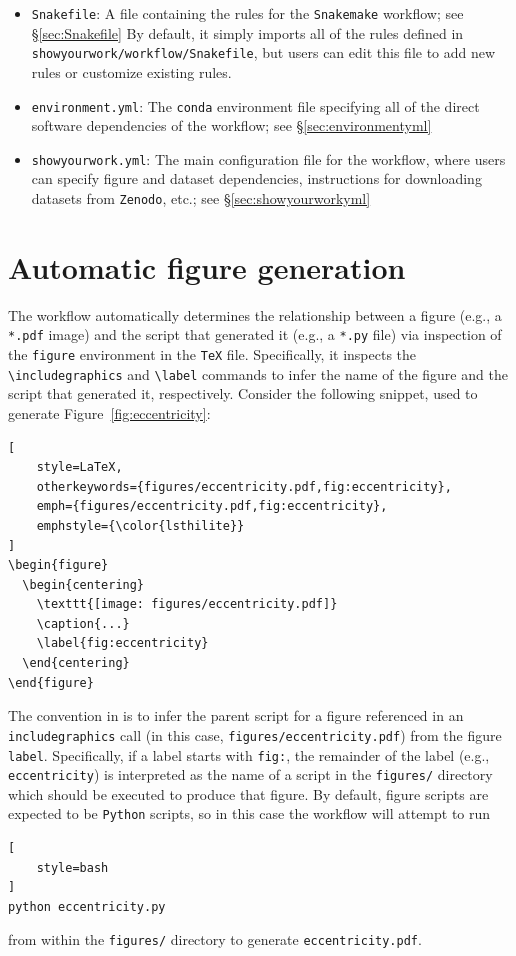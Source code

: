\documentclass[twocolumn]{aastex631}
\begin{document}
\begin{itemize}
    \item \texttt{Snakefile}: A file containing the rules for the \texttt{Snakemake} workflow; see \S\ref{sec:Snakefile}
    By default, it simply imports all of the rules defined in \texttt{showyourwork/workflow/Snakefile}, but users can edit this file to add new rules or customize existing rules.
    \item \texttt{environment.yml}: The \texttt{conda} environment file specifying all of the direct software dependencies of the workflow; see \S\ref{sec:environmentyml}
    \item \texttt{showyourwork.yml}: The main configuration file for the workflow, where users can specify figure and dataset dependencies, instructions for downloading datasets from \texttt{Zenodo}, etc.; see \S\ref{sec:showyourworkyml}
\end{itemize}

\section{Automatic figure generation}
\label{sec:auto-fig}
%
The workflow automatically determines the relationship between a figure (e.g., a \texttt{*.pdf} image) and the script that generated it (e.g., a \texttt{*.py} file) via inspection of the \texttt{figure} environment in the \texttt{TeX} file. 
Specifically, it inspects the \texttt{{\textbackslash}includegraphics} and \texttt{{\textbackslash}label} commands to infer the name of the figure and the script that generated it, respectively.
Consider the following snippet, used to generate Figure~\ref{fig:eccentricity}:
%
\begin{lstlisting}[
    style=LaTeX,
    otherkeywords={figures/eccentricity.pdf,fig:eccentricity},
    emph={figures/eccentricity.pdf,fig:eccentricity},
    emphstyle={\color{lsthilite}}
]
\begin{figure}
  \begin{centering}
    \texttt{[image: figures/eccentricity.pdf]}
    \caption{...}
    \label{fig:eccentricity}
  \end{centering}
\end{figure}
\end{lstlisting}
%
The convention in \showyourwork is to infer the parent script for a figure referenced in an \texttt{includegraphics} call (in this case, {\color{lsthilite}\texttt{figures/eccentricity.pdf}}) from the figure \texttt{label}. 
Specifically, if a label starts with {\color{lsthilite}\texttt{fig:}}, the remainder of the label (e.g., {\color{lsthilite}\texttt{eccentricity}}) is interpreted as the name of a script in the \texttt{figures/} directory which should be executed to produce that figure. 
By default, figure scripts are expected to be \texttt{Python} scripts, so in this case the workflow will attempt to run
%
\begin{lstlisting}[
    style=bash
]
python eccentricity.py
\end{lstlisting}
%
from within the \texttt{figures/} directory to generate \texttt{eccentricity.pdf}.
\end{document}

